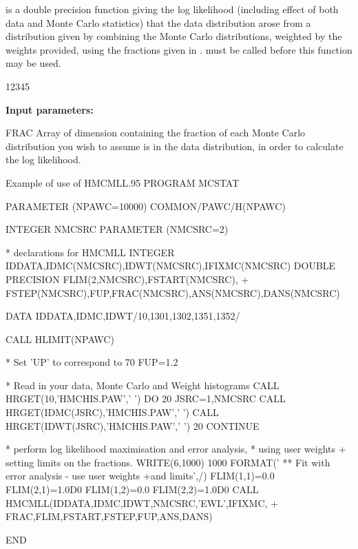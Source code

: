  
\Action
{} is a double precision function giving the log likelihood
(including effect of both data
and Monte Carlo statistics) that the data distribution arose from a
distribution given by combining the Monte Carlo distributions, weighted
by the weights provided, using the fractions given in .
 must be called before this function may be used.

\begin{DLtt}{12345}
\item[{\rm\bf Input parameters:}]
\item[FRAC] Array of dimension  containing the
fraction of each Monte Carlo distribution you wish to assume is in the data
distribution, in order to calculate the log likelihood.
\end{DLtt}
\newpage
\begin{XMPt}{Example of use of HMCMLL}\baselineskip.95\baselineskip\relax
       PROGRAM MCSTAT
 
       PARAMETER (NPAWC=10000)
       COMMON/PAWC/H(NPAWC)
 
       INTEGER NMCSRC
       PARAMETER (NMCSRC=2)
 
* declarations for HMCMLL
       INTEGER IDDATA,IDMC(NMCSRC),IDWT(NMCSRC),IFIXMC(NMCSRC)
       DOUBLE PRECISION FLIM(2,NMCSRC),FSTART(NMCSRC),
     + FSTEP(NMCSRC),FUP,FRAC(NMCSRC),ANS(NMCSRC),DANS(NMCSRC)
 
       DATA IDDATA,IDMC,IDWT/10,1301,1302,1351,1352/
 
       CALL HLIMIT(NPAWC)
 
* Set 'UP' to correspond to 70%
       FUP=1.2
 
* Read in your data, Monte Carlo and Weight histograms
       CALL HRGET(10,'HMCHIS.PAW',' ')
       DO 20 JSRC=1,NMCSRC
          CALL HRGET(IDMC(JSRC),'HMCHIS.PAW',' ')
          CALL HRGET(IDWT(JSRC),'HMCHIS.PAW',' ')
20     CONTINUE
 
* perform log likelihood maximisation and error analysis,
* using user weights + setting limits on the fractions.
       WRITE(6,1000)
1000   FORMAT(' ** Fit with error analysis - use user weights
     +and limits',/)
       FLIM(1,1)=0.0
       FLIM(2,1)=1.0D0
       FLIM(1,2)=0.0
       FLIM(2,2)=1.0D0
       CALL HMCMLL(IDDATA,IDMC,IDWT,NMCSRC,'EWL',IFIXMC,
     + FRAC,FLIM,FSTART,FSTEP,FUP,ANS,DANS)
 
       END
\end{XMPt}
